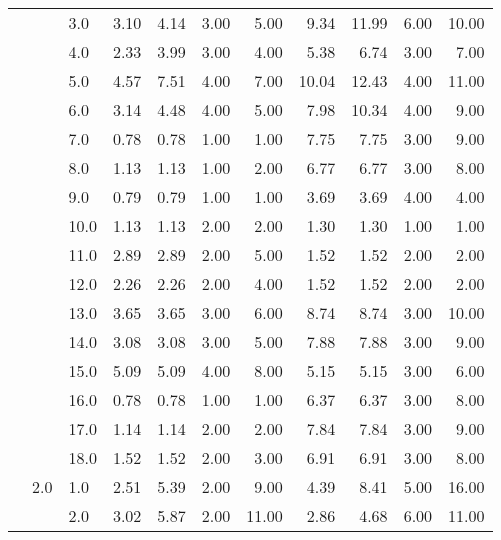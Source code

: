 \begin{tabular}{lllrrrrrrrr}
          &     & 3.0  &       3.10 &      4.14 &  3.00 &   5.00 &       9.34 &     11.99 &  6.00 &  10.00 \\
          &     & 4.0  &       2.33 &      3.99 &  3.00 &   4.00 &       5.38 &      6.74 &  3.00 &   7.00 \\
          &     & 5.0  &       4.57 &      7.51 &  4.00 &   7.00 &      10.04 &     12.43 &  4.00 &  11.00 \\
          &     & 6.0  &       3.14 &      4.48 &  4.00 &   5.00 &       7.98 &     10.34 &  4.00 &   9.00 \\
          &     & 7.0  &       0.78 &      0.78 &  1.00 &   1.00 &       7.75 &      7.75 &  3.00 &   9.00 \\
          &     & 8.0  &       1.13 &      1.13 &  1.00 &   2.00 &       6.77 &      6.77 &  3.00 &   8.00 \\
          &     & 9.0  &       0.79 &      0.79 &  1.00 &   1.00 &       3.69 &      3.69 &  4.00 &   4.00 \\
          &     & 10.0 &       1.13 &      1.13 &  2.00 &   2.00 &       1.30 &      1.30 &  1.00 &   1.00 \\
          &     & 11.0 &       2.89 &      2.89 &  2.00 &   5.00 &       1.52 &      1.52 &  2.00 &   2.00 \\
          &     & 12.0 &       2.26 &      2.26 &  2.00 &   4.00 &       1.52 &      1.52 &  2.00 &   2.00 \\
          &     & 13.0 &       3.65 &      3.65 &  3.00 &   6.00 &       8.74 &      8.74 &  3.00 &  10.00 \\
          &     & 14.0 &       3.08 &      3.08 &  3.00 &   5.00 &       7.88 &      7.88 &  3.00 &   9.00 \\
          &     & 15.0 &       5.09 &      5.09 &  4.00 &   8.00 &       5.15 &      5.15 &  3.00 &   6.00 \\
          &     & 16.0 &       0.78 &      0.78 &  1.00 &   1.00 &       6.37 &      6.37 &  3.00 &   8.00 \\
          &     & 17.0 &       1.14 &      1.14 &  2.00 &   2.00 &       7.84 &      7.84 &  3.00 &   9.00 \\
          &     & 18.0 &       1.52 &      1.52 &  2.00 &   3.00 &       6.91 &      6.91 &  3.00 &   8.00 \\
          & 2.0 & 1.0  &       2.51 &      5.39 &  2.00 &   9.00 &       4.39 &      8.41 &  5.00 &  16.00 \\
          &     & 2.0  &       3.02 &      5.87 &  2.00 &  11.00 &       2.86 &      4.68 &  6.00 &  11.00 \\

\end{tabular}
